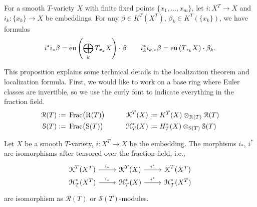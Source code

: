 \begin{proposition}
For a smooth $T$-variety $X$ with finite fixed points $\{x_1,\ldots,x_m \}$, let $i:X^T \longrightarrow X$ and $i_k: \{x_k\} \longrightarrow X$ be embeddings. For any $\beta \in K^T(X^T)$, $\beta_k \in K^T(\{x_k\})$, we have formulas
$$i^*i_* \beta =\operatorname{\operatorname{eu}} \left( \bigoplus_k T_{x_k}X \right) \cdot \beta \qquad i_{k}^*i_{k,*} \beta =\operatorname{\operatorname{eu}} \left( T_{x_k}X \right) \cdot \beta_k.$$


\end{proposition}

This proposition explains some technical details in the localization theorem and localization formula. First, we would like to work on a base ring where Euler classes are invertible, so we use the curly font to indicate everything in the fraction field.
\begin{equation*}
\begin{aligned}
  \operatorname{\operatorname{\mathcal{R}}}(T):=\;& \operatorname{\operatorname{Frac}}\!\big(\!\operatorname{\operatorname{R}}(T)\big) \qquad & \operatorname{\operatorname{\mathcal{K}}}^T(X):=\;& K^T(X) \otimes_{\operatorname{\operatorname{R}}(T)}\operatorname{\operatorname{\mathcal{R}}}(T)  \\ 
  \operatorname{\operatorname{\mathcal{S}}}(T):=\;& \operatorname{\operatorname{Frac}}\!\big(\!\operatorname{\operatorname{S}}(T)\big) \qquad & \operatorname{\operatorname{\mathcal{H}}}_{T}^{*}(X):=\;& H_{T}^{*}(X) \otimes_{\operatorname{\operatorname{S}}(T)}\operatorname{\operatorname{\mathcal{S}}}(T)  \\
\end{aligned}
\end{equation*}


\begin{theorem} \label{thm:localization_theorem}
Let $X$ be a smooth $T$-variety,  $i:X^T \longrightarrow X$ be the embedding. The morphisms $i_*$, $i^*$ are isomorphisms after tensored over the fraction field, i.e.,
\[\begin{tikzcd}[row sep=0mm]
	{\Kcurl^T(X^T)} & {\Kcurl^T(X)} & {\Kcurl^T(X^T)} \\
	{\Hcurl_{T}^{*}(X^T)} & {\Hcurl_{T}^{*}(X)} & {\Hcurl_{T}^{*}(X^T)}
	\arrow["{i^*}", from=1-2, to=1-3]
	\arrow["{i_*}", from=2-1, to=2-2]
	\arrow["{i^*}", from=2-2, to=2-3]
	\arrow["{i_*}", from=1-1, to=1-2]
\end{tikzcd}\]
are isomorphism as $\mathcal{R}(T)$ or $\mathcal{S}(T)$-modules.
\end{theorem}

